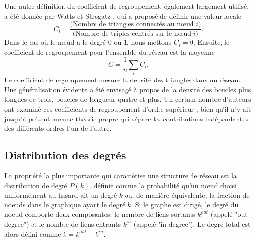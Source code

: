 Une autre définition du coefficient de regroupement, également largement utilisé, a été donnée par Watts et Strogatz \cite{WS1998},
qui a proposé de définir une valeur locale
 \begin{equation}
    C_i=\frac{\text{(Nombre de triangles connectés au nœud $i$)}}{\text{(Nombre de triples centrés sur le nœud $i$)}}.
  \end{equation}
  Dans le cas où le nœud a le degré $0$ ou $1$, nous mettons $C_i=0$, Ensuite, le coefficient de regroupement pour l'ensemble
  du réseau est la moyenne
  \begin{equation}
    C=\frac{1}{n}\sum_i C_i.
  \end{equation}
 Le coefficient de regroupement mesure la densité des triangles dans un réseau. Une généralisation évidente a été envisagé à 
propos de la densité des boucles plus longues de trois, boucles de longueur quatre et plus. Un certain nombre d'auteurs ont 
examiné ces coefficients de regroupement d'ordre supérieur \cite{Ne2003,BC2003,Fron-al2002,Gle-al2001}, bien qu'il n'y ait jusqu'à présent
aucune théorie propre qui sépare les contributions indépendantes des différents ordres l'un de l'autre.
   \subsection{Distribution des degrés}
   La propriété la plus importante qui caractérise une structure de réseau est la distribution de degré $P(k)$,
   définie comme la probabilité qu'un nœud choisi uniformément au hasard ait un degré $k$ ou, de manière équivalente, la
   fraction de noeuds dans le graphique ayant le degré $k$.
   Si le graphe est dirigé, le degré du noeud comporte deux composantes: le nombre de liens sortants $k^{out}$ (appelé
   "out-degree") et le nombre de liens entrants $k^{in}$ (appelé "in-degree"). Le degré total est alors défini comme 
   $k=k^{out}+k^{in}$.\\

